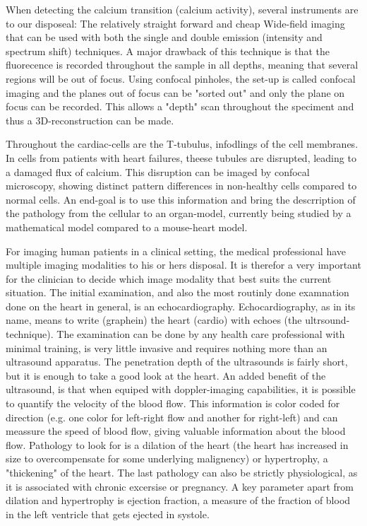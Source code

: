 \documentclass[12p]{article}
\begin{document}
When detecting the calcium transition (calcium activity), several instruments are to our disposeal: 
The relatively straight forward and cheap Wide-field imaging that can be used with both the single and double emission (intensity and spectrum shift) techniques. 
A major drawback of this technique is that the fluorecence is recorded throughout the sample in all depths, meaning that several regions will be out of focus.
Using confocal pinholes, the set-up is called confocal imaging and the planes out of focus can be "sorted out" and only the plane on focus can be recorded.
This allows a "depth" scan throughout the speciment and thus a 3D-reconstruction can be made.

Throughout the cardiac-cells are the T-tubulus, infodlings of the cell membranes.
In cells from patients with heart failures, theese tubules are disrupted, leading to a damaged flux of calcium.
This disruption can be imaged by confocal microscopy, showing distinct pattern differences in non-healthy cells compared to normal cells.
An end-goal is to use this information and bring the descrription of the pathology from the cellular to an organ-model, currently being studied by a mathematical model compared to a mouse-heart model.

For imaging human patients in a clinical setting, the medical professional have multiple imaging modalities to his or hers disposal.
It is therefor a very important for the clinician to decide which image modality that best suits the current situation.
The initial examination, and also the most routinly done examnation done on the heart in general, is an echocardiography.
Echocardiography, as in its name, means to write (graphein) the heart (cardio) with echoes (the ultrsound-technique).
The examination can be done by any health care professional with minimal training, is very little invasive and requires nothing more than an ultrasound apparatus.
The penetration depth of the ultrasounds is fairly short, but it is enough to take a good look at the heart.
An added benefit of the ultrasound, is that when equiped with doppler-imaging capabilities, it is possible to quantify the velocity of the blood flow.
This information is color coded for direction (e.g. one color for left-right flow and another for right-left) and can meassure the speed of blood flow, giving valuable information about the blood flow.
Pathology to look for is a dilation of the heart (the heart has increased in size to overcompensate for some underlying malignency) or hypertrophy, a "thickening" of the heart.
The last pathology can also be strictly physiological, as it is associated with chronic excersise or pregnancy.
A key parameter apart from dilation and hypertrophy is ejection fraction, a measure of the fraction of blood in the left ventricle that gets ejected in systole.
\end{document}
